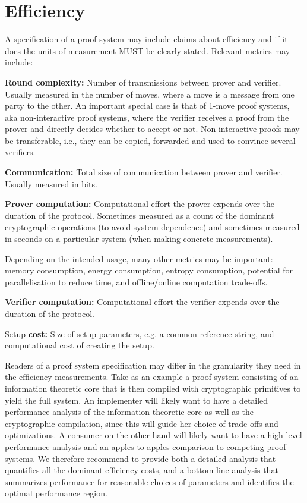 \section{Efficiency}
\label{security:Efficiency}
 
A specification of a proof system may include claims about efficiency and if it does the units of measurement MUST be clearly stated. Relevant metrics may include:

\begin{bulletize}
    \item \textbf{Round complexity:} Number of transmissions between prover and verifier. Usually measured in the number of moves, where a move is a message from one party to the other.
An important special case is that of 1-move proof systems, aka non-interactive proof systems, where the verifier receives a proof from the prover and directly decides whether to accept or not. Non-interactive proofs may be transferable, i.e., they can be copied, forwarded and used to convince several verifiers.
    \item \textbf{Communication:} Total size of communication between prover and verifier. Usually measured in bits.
    \item \textbf{Prover computation:} Computational effort the prover expends over the duration of the protocol. Sometimes measured as a count of the dominant cryptographic operations (to avoid system dependence) and sometimes measured in seconds on a particular system (when making concrete measurements).
    \item Depending on the intended usage, many other metrics may be important: memory consumption, energy consumption, entropy consumption, potential for parallelisation to reduce time, and offline/online computation trade-offs.
    \item \textbf{Verifier computation:} Computational effort the verifier expends over the duration of the protocol.
    \item Setup \textbf{cost:} Size of setup parameters, e.g. a common reference string, and computational cost of creating the setup.
\end{bulletize} 

Readers of a proof system specification may differ in the granularity they need in the efficiency measurements. Take as an example a proof system consisting of an information theoretic core that is then compiled with cryptographic primitives to yield the full system. An implementer will likely want to have a detailed performance analysis of the information theoretic core as well as the cryptographic compilation, since this will guide her choice of trade-offs and optimizations. A consumer on the other hand will likely want to have a high-level performance analysis and an apples-to-apples comparison to competing proof systems. We therefore recommend to provide both a detailed analysis that quantifies all the dominant efficiency costs, and a bottom-line analysis that summarizes performance for reasonable choices of parameters and identifies the optimal performance region.
\loosen


